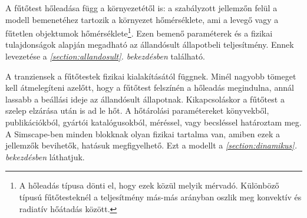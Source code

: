 
A fűtőtest hőleadása függ a környezetétől is: a szabályzott jellemzőn felül a modell bemenetéhez tartozik a környezet hőmérséklete, ami a levegő vagy a fűtetlen objektumok hőmérséklete\footnote{A hőleadás típusa dönti el, hogy ezek közül melyik mérvadó. Különböző típusú fűtőtesteknél a teljesítmény más-más arányban oszlik meg konvektív és radiatív hőátadás között.}.
Ezen bemenő paraméterek és a fizikai tulajdonságok alapján megadható az állandósult állapotbeli teljesítmény. Ennek levezetése a \textit{\ref{section:allandosult}. bekezdésben} található.

A tranziensek a fűtőtestek fizikai kialakításától függnek. Minél nagyobb tömeget kell átmelegíteni azelőtt, hogy a fűtőtest felszínén a hőleadás megindulna, annál lassabb a beállási ideje az állandósult állapotnak. Kikapcsoláskor a fűtőtest a szelep elzárása után is ad le hőt. %
A hőtárolási paramétereket könyvekből, publikációkból, gyártói katalógusokból, méréssel, vagy becsléssel határoztam meg. A Simscape-ben minden blokknak olyan fizikai tartalma van, amiben ezek a jellemzők bevihetők, hatásuk megfigyelhető. Ezt a modellt a \textit{\ref{section:dinamikus}. bekezdésben} láthatjuk.


%



